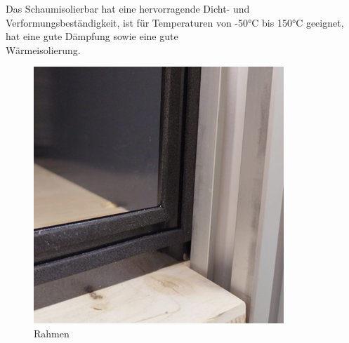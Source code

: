 Das Schaumisolierbar hat eine hervorragende Dicht- und Verformungsbeständigkeit, ist für Temperaturen von -50°C bis 150°C geeignet, hat eine gute Dämpfung sowie eine gute \\
Wärmeisolierung.
\begin{figure}[H]
    \centering
    \includegraphics{image/rahmen2.png}
    \caption{Rahmen}
    \label{fig:enter-label}
\end{figure}
\vspace{5mm}

